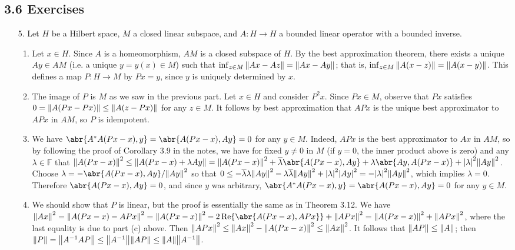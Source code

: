 \documentclass[11pt,leqno]{article}
\theoremstyle{plain}
\theoremstyle{definition}
\numberwithin{equation}{section}
\numberwithin{lem}{section}
\begin{document}
\subsection*{3.6 Exercises}
\begin{enumerate}
    \item[5.] Let $H$ be a Hilbert space, $M$ a closed linear subspace, and $A\colon H\to H$ a bounded linear operator with a bounded inverse.
    \begin{enumerate}
        \item Let $x\in H$. Since $A$ is a homeomorphism, $AM$ is a closed subspace of $H$. By the best approximation theorem, there exists a unique $Ay\in AM$ (i.e. a unique $y=y(x)\in M$) such that $\inf_{z\in M}\norm{Ax-Az} = \norm{Ax-Ay}$; that is, $\inf_{z\in M}\norm{A(x-z)} = \norm{A(x-y)}$. This defines a map $P\colon H\to M$ by $Px = y$, since $y$ is uniquely determined by $x$.
        \item The image of $P$ is $M$ as we saw in the previous part. Let $x\in H$ and consider $P^2x$. Since $Px\in M$, observe that $Px$ satisfies $0= \norm{A(Px-Px)}\leq \norm{A(z-Px)}$ for any $z\in M$. It follows by best approximation that $APx$ is the unique best approximator to $APx$ in $AM$, so $P$ is idempotent.
        \item We have $\abr{A^\ast A(Px-x),y} = \abr{A(Px-x),Ay} = 0$ for any $y\in M$. Indeed, $APx$ is the best approximator to $Ax$ in $AM$, so by following the proof of Corollary 3.9 in the notes, we have for fixed $y\neq 0$ in $M$ (if $y=0$, the inner product above is zero) and any $\lambda\in \mathbb F$ that $\norm{A(Px-x)}^2\leq \norm{A(Px-x) +\lambda Ay} = \norm{A(Px-x)}^2 + \overline{\lambda}\abr{A(Px-x),Ay} + \lambda\abr{Ay,A(Px-x)} + \abs{\lambda}^2\norm{Ay}^2$. Choose $\lambda = -\abr{A(Px-x),Ay}/\norm{Ay}^2$ so that $0\leq -\overline{\lambda}\lambda\norm{Ay}^2 -\lambda\overline{\lambda}\norm{Ay}^2+ \abs{\lambda}^2\abs{Ay}^2 = -\abs{\lambda}^2\norm{Ay}^2$, which implies $\lambda = 0$. Therefore $\abr{A(Px-x),Ay} = 0$, and since $y$ was arbitrary, $\abr{A^\ast A(Px-x),y} = \abr{A(Px-x),Ay} = 0$ for any $y\in M$.
        \item We should show that $P$ is linear, but the proof is essentially the same as in Theorem 3.12. We have $\norm{Ax}^2 = \norm{A(Px-x) - APx}^2 = \norm{A(Px-x)}^2-2\Re\abr{A(Px-x), APx} +\norm{APx}^2 = \norm{A(Px-x)}^2 +\norm{APx}^2$, where the last equality is due to part (c) above. Then $\norm{APx}^2\leq \norm{Ax}^2 - \norm{A(Px-x)}^2\leq \norm{Ax}^2$. It follows that $\norm{AP}\leq \norm{A}$; then $\norm{P}= \norm{A^{-1}AP}\leq \norm{A^{-1}}\norm{AP}\leq \norm{A}\norm{A^{-1}}$.

\end{enumerate}
\end{enumerate}
\end{document}
